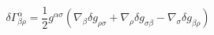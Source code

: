 \begin{equation}
\delta \Gamma _{\beta \rho }^{\alpha }=\frac{1}{2}g^{\alpha \sigma }(\nabla
_{\beta }\delta g_{\rho \sigma }+\nabla _{\rho }\delta g_{\sigma \beta
}-\nabla _{\sigma }\delta g_{\beta \rho })
\end{equation}


